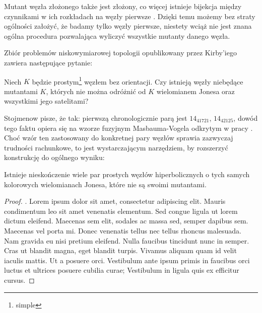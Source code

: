 Mutant węzła złożonego także jest złożony, co więcej istnieje bijekcja między czynnikami w ich rozkładach na węzły pierwsze \cite{ruberman87}.
Dzięki temu możemy bez straty ogólności założyć, że badamy tylko węzły pierwsze, niestety wciąż nie jest znana ogólna procedura pozwalająca wyliczyć wszystkie mutanty danego węzła.

Zbiór problemów niskowymiarowej topologii opublikowany przez Kirby'iego \cite{kirby78} zawiera następujące pytanie:
\begin{conjecture}[problem 1.91]
    Niech $K$ będzie prostym\footnote{simple} węzłem bez orientacji.
    Czy istnieją węzły niebędące mutantami $K$, których nie można odróżnić od $K$ wielomianem Jonesa oraz wszystkimi jego satelitami?
\end{conjecture}

Stojmenow pisze, że tak: pierwszą chronologicznie parą jest $14_{41721}$, $14_{42125}$, dowód tego faktu opiera się na wzorze fuzyjnym Masbauma-Vogela odkrytym w pracy \cite{masbaum94}.
Choć wzór ten zastosowany do konkretnej pary węzłów sprawia zazwyczaj trudności rachunkowe, to jest wystarczającym narzędziem, by rozszerzyć konstrukcję do ogólnego wyniku:

\begin{proposition}
    Istnieje nieskończenie wiele par prostych węzłów hiperbolicznych o tych samych kolorowych wielomianach Jonesa, które nie są swoimi mutantami.
\end{proposition}

\begin{proof}
    \cite{toshifumi09}.
    Lorem ipsum dolor sit amet, consectetur adipiscing elit.
    Mauris condimentum leo sit amet venenatis elementum.
    Sed congue ligula ut lorem dictum eleifend.
    Maecenas sem elit, sodales ac massa sed, semper dapibus sem.
    Maecenas vel porta mi.
    Donec venenatis tellus nec tellus rhoncus malesuada.
    Nam gravida eu nisi pretium eleifend.
    Nulla faucibus tincidunt nunc in semper.
    Cras ut blandit magna, eget blandit turpis.
    Vivamus aliquam quam id velit iaculis mattis.
    Ut a posuere orci.
    Vestibulum ante ipsum primis in faucibus orci luctus et ultrices posuere cubilia curae; Vestibulum in ligula quis ex efficitur cursus.
\end{proof}

